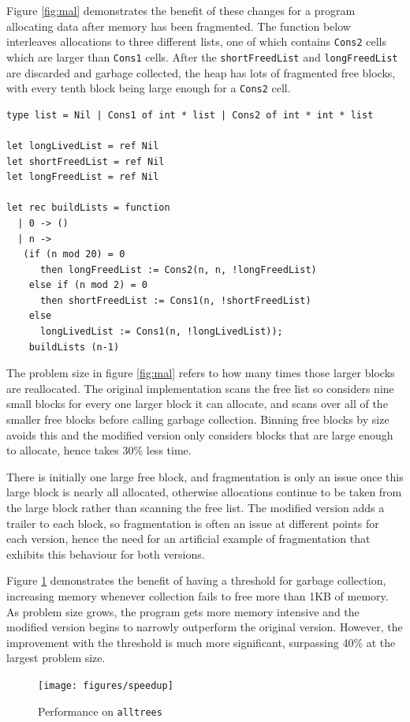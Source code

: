 Figure \ref{fig:mal} demonstrates the benefit of these changes for a program allocating data after memory has been fragmented. The function below interleaves allocations to three different lists, one of which contains \verb|Cons2| cells which are larger than \verb|Cons1| cells. After the \verb|shortFreedList| and \verb|longFreedList| are discarded and garbage collected, the heap has lots of fragmented free blocks, with every tenth block being large enough for a \verb|Cons2| cell. 
\begin{verbatim}
type list = Nil | Cons1 of int * list | Cons2 of int * int * list

let longLivedList = ref Nil
let shortFreedList = ref Nil
let longFreedList = ref Nil

let rec buildLists = function
  | 0 -> ()
  | n ->
   (if (n mod 20) = 0
      then longFreedList := Cons2(n, n, !longFreedList)
    else if (n mod 2) = 0
      then shortFreedList := Cons1(n, !shortFreedList)
    else 
      longLivedList := Cons1(n, !longLivedList));
    buildLists (n-1)
\end{verbatim}
The problem size in figure \ref{fig:mal} refers to how many times those larger blocks are reallocated. The original implementation scans the free list so considers nine small blocks for every one larger block it can allocate, and scans over all of the smaller free blocks before calling garbage collection. Binning free blocks by size avoids this and the modified version only considers blocks that are large enough to allocate, hence takes 30\% less time. 

There is initially one large free block, and fragmentation is only an issue once this large block is nearly all allocated, otherwise allocations continue to be taken from the large block rather than scanning the free list. The modified version adds a trailer to each block, so fragmentation is often an issue at different points for each version, hence the need for an artificial example of fragmentation that exhibits this behaviour for both versions.

Figure \ref{fig:speedup} demonstrates the benefit of having a threshold for garbage collection, increasing memory whenever collection fails to free more than 1KB of memory. As problem size grows, the program gets more memory intensive and the modified version begins to narrowly outperform the original version. However, the improvement with the threshold is much more significant, surpassing 40\% at the largest problem size.

\begin{figure}[H]
\hfill \texttt{[image: figures/speedup]} \hfill
\cprotect\caption{Performance on \verb|alltrees|}
 \label{fig:speedup} 
\end{figure}


